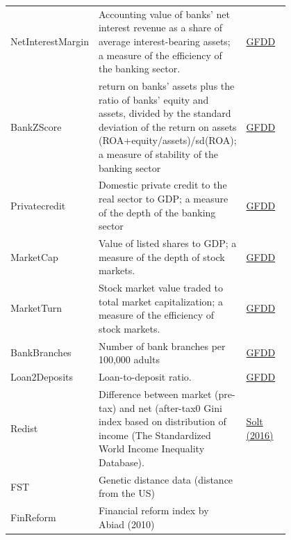 \documentclass[a4paper,11pt]{article}
\begin{document}
\begin{center}
\begin{longtable}{l p{0.50\linewidth} p{0.3\linewidth}}
  NetInterestMargin & Accounting value of banks' net interest revenue as a share of average interest-bearing assets; a measure of the efficiency of the banking sector. & \href{http://data.worldbank.org/data-catalog/global-financial-development}{GFDD} \\
  
  BankZScore & return on banks' assets plus the ratio of banks' equity and assets, divided
  by the standard deviation of the return on assets (ROA+equity/assets)/sd(ROA); a measure of stability of the banking sector & \href{http://data.worldbank.org/data-catalog/global-financial-development}{GFDD} \\
  
  Privatecredit & Domestic private credit to the real sector to GDP; a measure of the depth of the banking sector & \href{http://data.worldbank.org/data-catalog/global-financial-development}{GFDD} \\
  
  MarketCap & Value of listed shares to GDP; a measure of the
  depth of stock markets.& \href{http://data.worldbank.org/data-catalog/global-financial-development}{GFDD} \\
  
  MarketTurn & Stock market value traded to total market capitalization; a measure of the efficiency of stock markets. & \href{http://data.worldbank.org/data-catalog/global-financial-development}{GFDD} \\
  
  BankBranches & Number of bank branches per 100,000 adults & \href{http://data.worldbank.org/data-catalog/global-financial-development}{GFDD} \\

  Loan2Deposits & Loan-to-deposit ratio. & \href{http://data.worldbank.org/data-catalog/global-financial-development}{GFDD} \\
  
  Redist & Difference between market (pre-tax) and net (after-tax0 Gini index based on distribution of income  (The Standardized World Income Inequality Database). & \href{http://fsolt.org/swiid/}{Solt (2016)} \\	

  FST & Genetic distance data (distance from the US) & \href{https://sites.tufts.edu/enricospolaore/research/}{\citet{spolaore2009diffusion}} \\

  FinReform & Financial reform index by Abiad (2010) & \href{https://www.imf.org/en/Publications/WP/Issues/2016/12/31/A-New-Database-of-Financial-Reforms-22485}{\citet{Abiadetal2008}} \\


\end{longtable}
\end{center}
\end{document}

